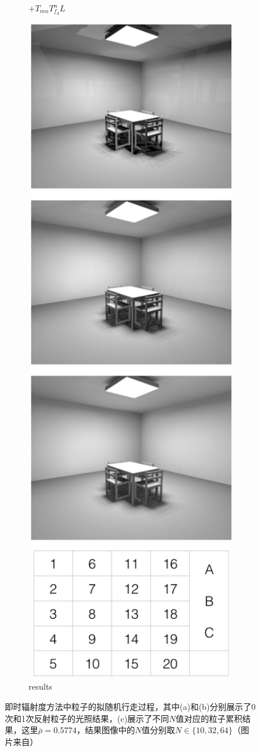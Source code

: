 \begin{figure}
\begin{fullwidth}
\begin{subfigure}[b]{0.37\thewidth}
		\caption{$+T_{mn}T^{n}_{f_d}L$}
	\end{subfigure}
	\begin{subfigure}[b]{0.235\thewidth}
		\includegraphics[width=1.0\textwidth]{figures/ir/ir-1-3}
		\caption{results}
	\end{subfigure}
\end{fullwidth}
\caption{即时辐射度方法中粒子的拟随机行走过程，其中(a)和(b)分别展示了0次和1次反射粒子的光照结果，(c)展示了不同$N$值对应的粒子累积结果，这里$\overline{\rho}=0.5774$，结果图像中的$N$值分别取$N\in\{ 10,32,64\}$（图片来自\cite{a:InstantRadiosity}）}
\label{f:ir-instant-radiosity-example}
\end{figure}
